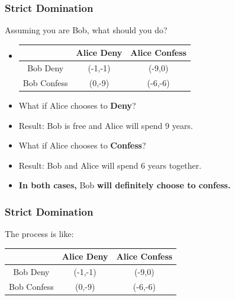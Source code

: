 \documentclass{beamer}
\begin{document}
\begin{frame}
\frametitle{Strict Domination}
Assuming you are {\color{blue}Bob}, what should you do?\\
\begin{itemize}[<+->]
\item
\begin{tabular}{|c|c|c|}
\hline
\hline
    &{\color{red}Alice} Deny&{\color{red}Alice} Confess\\
\hline
{\color{blue}Bob} Deny& ({\color{blue}-1},{\color{red}-1}) & ({\color{blue}-9},{\color{red}0})\\
\hline
{\color{blue}Bob} Confess& ({\color{blue}0},{\color{red}-9}) & ({\color{blue}-6},{\color{red}-6})\\
\hline
\hline
\end{tabular}

\item
What if {\color{red}Alice} chooses to \textbf{Deny}?
\item
Result: {\color{blue}Bob} is free and {\color{red}Alice} will spend 9 years.
\item
What if {\color{red}Alice} chooses to \textbf{Confess}?
\item
Result: {\color{blue}Bob} and {\color{red}Alice} will spend 6 years together.
\item
\textbf{In both cases, }{\color{blue}Bob}\textbf{ will definitely choose to confess.}
\end{itemize}
\end{frame}

\begin{frame}
\frametitle{Strict Domination}
The process is like:\\
\centering
\begin{tabular}{|c|c|c|}
\hline
\hline
    &{\color{red}Alice} Deny&{\color{red}Alice} Confess\\
\hline
{\color{blue}Bob} Deny& ({\color{blue}-1},{\color{red}-1}) & ({\color{blue}-9},{\color{red}0})\\
\hline
{\color{blue}Bob} Confess& ({\color{blue}0},{\color{red}-9}) & ({\color{blue}-6},{\color{red}-6})\\
\hline
\hline
\end{tabular}
\end{frame}
\end{document}
